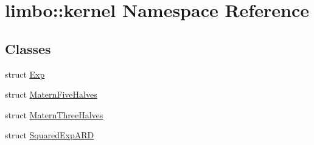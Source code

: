 \hypertarget{namespacelimbo_1_1kernel}{}\section{limbo\+:\+:kernel Namespace Reference}
\label{namespacelimbo_1_1kernel}
\subsection*{Classes}
\begin{DoxyCompactItemize}
\item 
struct \hyperlink{structlimbo_1_1kernel_1_1_exp}{Exp}
\item 
struct \hyperlink{structlimbo_1_1kernel_1_1_matern_five_halves}{Matern\+Five\+Halves}
\item 
struct \hyperlink{structlimbo_1_1kernel_1_1_matern_three_halves}{Matern\+Three\+Halves}
\item 
struct \hyperlink{structlimbo_1_1kernel_1_1_squared_exp_a_r_d}{Squared\+Exp\+A\+R\+D}
\end{DoxyCompactItemize}
